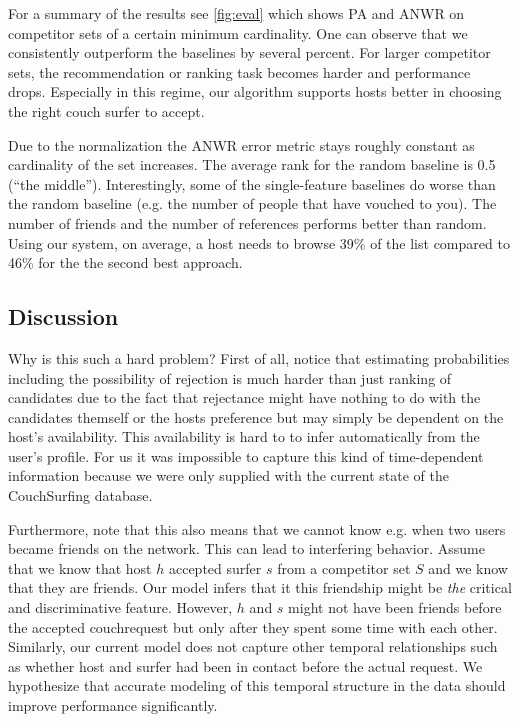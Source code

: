 For a summary of the results see \autoref{fig:eval} which shows PA and ANWR on competitor sets of a certain minimum cardinality.
One can observe that we consistently outperform the baselines by several percent.
For larger competitor sets, the recommendation or ranking task becomes harder and performance drops.
Especially in this regime, our algorithm supports hosts better in choosing the right couch surfer to accept.

Due to the normalization the ANWR error metric stays roughly constant as cardinality of the set increases.
The average rank for the random baseline is 0.5 (``the middle'').
Interestingly, some of the single-feature baselines do worse than the random baseline (e.g. the number of people that have vouched to you).
The number of friends and the number of references performs better than random.
Using our system, on average, a host needs to browse 39\% of the list compared to 46\% for the the second best approach.

\subsection{Discussion}
Why is this such a hard problem? First of all, notice that estimating probabilities including the possibility of rejection is much harder than just ranking of candidates due to the fact that rejectance might have nothing to do with the candidates themself or the hosts preference but may simply be dependent on the host's availability. This availability is hard to to infer automatically from the user's profile. For us it was impossible to capture this kind of time-dependent information because we were only supplied with the current state of the CouchSurfing database.

Furthermore, note that this also means that we cannot know e.g. when two users became friends on the network. This can lead to interfering behavior. Assume that we know that host $h$ accepted surfer $s$ from  a competitor set $S$ and we know that they are friends. Our model infers that it this friendship might be \textit{the} critical and discriminative feature. However, $h$ and $s$ might not have been friends before the accepted couchrequest but only after they spent some time with each other. Similarly, our current model does not capture other temporal relationships such as whether host and surfer had been in contact before the actual request. We hypothesize that accurate modeling of this temporal structure in the data should improve performance significantly.
